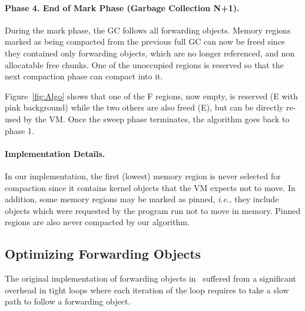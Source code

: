 \documentclass[sigplan,10pt,review,anonymous]{acmart}\settopmatter{printfolios=true,printccs=false,printacmref=false}
\def\ie{\emph{i.e., }}
\begin{document}
\paragraph{Phase 4. End of Mark Phase (Garbage Collection N+1).} During the mark phase, the GC follows all forwarding objects. Memory regions marked as being compacted from the previous full GC can now be freed since they contained only forwarding objects, which are no longer referenced, and non allocatable free chunks. One of the unoccupied regions is reserved so that the next compaction phase can compact into it.

Figure~\ref{fig:Algo} shows that one of the F regions, now empty, is reserved (E with pink background) while the two others are also freed (E), but can be directly re-used by the VM. Once the sweep phase terminates, the algorithm goes back to phase 1.

\paragraph{Implementation Details.}
In our implementation, the first (lowest) memory region is never selected for compaction since it contains kernel objects that the VM expects not to move. In addition, some memory regions may be marked as pinned, \ie they include objects which were requested by the program run not to move in memory. Pinned regions are also never compacted by our algorithm.%

\subsection{Optimizing Forwarding Objects}

The original implementation of forwarding objects in~\cite{Forwarders} suffered from a significant overhead in
tight loops where each iteration of the loop requires to take a slow path to follow a forwarding object.
\end{document}
